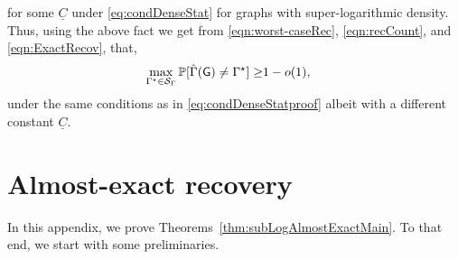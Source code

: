 \documentclass[12pt]{article}
\makeatletter
\newcommand{\bE}{\mathbb{E}}
\newcommand {\pr} {\mathbb{P}}
\newcommand{\calG}{{\cal G}}
\newcommand{\calS}{{\cal S}}
\newcommand{\pp}[1]{\left[#1\right]}
\newcommand{\s}[1]{\mathsf{#1}}
\renewcommand{\paragraph}{%
  \@startsection{paragraph}{4}%
  {\z@}{1.25ex \@plus 1ex \@minus .2ex}{-1em}%
  {\normalfont\normalsize\bfseries}%
}
\makeatother
\begin{document}
for some $\underline{C}$ under \eqref{eq:condDenseStat} for graphs with super-logarithmic density. Thus, using the above fact we get from \eqref{eqn:worst-caseRec}, \eqref{eqn:recCount}, and \eqref{eqn:ExactRecov}, that,
\begin{align}
    \max_{\Gamma^\star\in\calS_{\Gamma}}\pr[\hat{\Gamma}(\s{G})\neq\Gamma^\star]\geq & 1-o(1),\label{eqn:ExactRecov2}
\end{align}
under the same conditions as in \eqref{eq:condDenseStatproof} albeit with a different constant $\underline{C}$.


\section{Almost-exact recovery}\label{app:weakRec}
In this appendix, we prove Theorems~\ref{thm:subLogAlmostExactMain}. To that end, we start with some preliminaries. 
\end{document}
